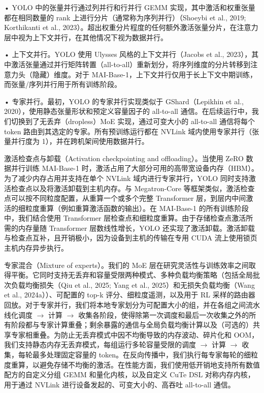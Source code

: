 \documentclass[
  10
]{article}
\begin{document}
• YOLO 中的张量并行通过列并行和行并行 GEMM 实现，其中激活和权重张量都在相同数量的 rank 上进行分片（通常称为序列并行）（Shoeybi et al., 2019; Korthikanti et al., 2023）。超出权重分片程度的任何额外激活张量分片，在注意力层中视为上下文并行，在其他情况下视为数据并行。

• 上下文并行。YOLO 使用 Ulysses 风格的上下文并行（Jacobs et al., 2023），其中激活张量通过并行矩阵转置（all-to-all）重新划分，将序列维度的分片转移到注意力头（隐藏）维度。对于 MAI-Base-1，上下文并行仅用于长上下文中期训练，而张量/序列并行用于所有训练阶段。

• 专家并行。最初，YOLO 的专家并行实现类似于 GShard（Lepikhin et al., 2020），使用静态张量形状和预定义容量因子的 all-to-all 通信。在后续运行中，我们切换到了无丢弃（dropless）MoE 实现，通过可变大小的 all-to-all 通信将每个 token 路由到其选定的专家。所有预训练运行都在 NVLink 域内使用专家并行（张量并行度为 1），并在跨机架间使用数据并行。

激活检查点与卸载（Activation checkpointing and offloading）。当使用 ZeRO 数据并行训练 MAI-Base-1 时，激活占用了大部分可用的高带宽设备内存（HBM）。为了减少内存占用并支持在单个 NVLink 域内进行专家并行，YOLO 同时支持激活检查点以及将激活卸载到主机内存。与 Megatron-Core 等框架类似，激活检查点可以按不同粒度配置，从重算一个或多个完整 Transformer 层，到层内中间激活的细粒度重算（例如重算激活函数的输出）。在 MAI-Base-1 的所有训练阶段中，我们结合使用 Transformer 层检查点和细粒度重算。由于存储检查点激活所需的内存量随 Transformer 层数线性增长，YOLO 还实现了激活卸载。激活卸载与检查点互补，且开销极小，因为设备到主机的传输在专用 CUDA 流上使用锁页主机内存异步执行。

专家混合（Mixture of experts）。我们的 MoE 层在研究灵活性与训练效率之间取得平衡。它同时支持无丢弃和容量受限两种模式、多种负载均衡策略（包括全局批次负载均衡损失（Qiu et al., 2025; Yang et al., 2025）和无损失负载均衡（Wang et al., 2024a））、可配置的 top-k 评分、细粒度遥测，以及用于 RL 采样的路由器回放。对于专家并行，我们将本地专家划分为可配置大小的组，并在各组之间流水线化调度 $\to$ 计算 $\to$ 收集各阶段，使得除第一次调度和最后一次收集之外的所有阶段都与专家计算重叠；剩余暴露的通信与全局负载均衡计算以及（可选的）共享专家相重叠。为防止无丢弃模式中因不均衡导致的内存波动、碎片化和 OOM，我们支持静态内存无丢弃模式，每组运行多轮容量受限的调度 $\to$ 计算 $\to$ 收集，每轮最多处理固定容量的 token。在反向传播中，我们执行每专家每轮的细粒度重算，以避免存储不均衡的激活。在性能方面，我们使用低开销地支持所有数值配方的自定义分组 GEMM 和量化内核，以及自定义 CuTe DSL 对称内存内核，用于通过 NVLink 进行设备发起的、可变大小的、高吞吐 all-to-all 通信。
\end{document}
